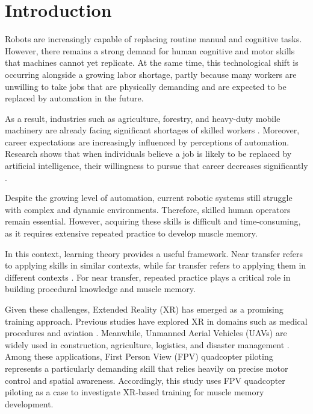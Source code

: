 \section{Introduction}

Robots are increasingly capable of replacing routine manual and cognitive tasks. However, there remains a strong demand for human cognitive and motor skills that machines cannot yet replicate. At the same time, this technological shift is occurring alongside a growing labor shortage, partly because many workers are unwilling to take jobs that are physically demanding and are expected to be replaced by automation in the future.

As a result, industries such as agriculture, forestry, and heavy-duty mobile machinery are already facing significant shortages of skilled workers \parencite{machado_autonomous_2021}. Moreover, career expectations are increasingly influenced by perceptions of automation. Research shows that when individuals believe a job is likely to be replaced by artificial intelligence, their willingness to pursue that career decreases significantly \parencite{wang_influence_2026}.

Despite the growing level of automation, current robotic systems still struggle with complex and dynamic environments. Therefore, skilled human operators remain essential. However, acquiring these skills is difficult and time-consuming, as it requires extensive repeated practice to develop muscle memory.

In this context, learning theory provides a useful framework. Near transfer refers to applying skills in similar contexts, while far transfer refers to applying them in different contexts \parencite{barnett_when_2002}. For near transfer, repeated practice plays a critical role in building procedural knowledge and muscle memory.

Given these challenges, Extended Reality (XR) has emerged as a promising training approach. Previous studies have explored XR in domains such as medical procedures and aviation \parencite{dutescu_virtual_2025}. Meanwhile, Unmanned Aerial Vehicles (UAVs) are widely used in construction, agriculture, logistics, and disaster management \parencite{otto_optimization_2018}. Among these applications, First Person View (FPV) quadcopter piloting represents a particularly demanding skill that relies heavily on precise motor control and spatial awareness. Accordingly, this study uses FPV quadcopter piloting as a case to investigate XR-based training for muscle memory development.

